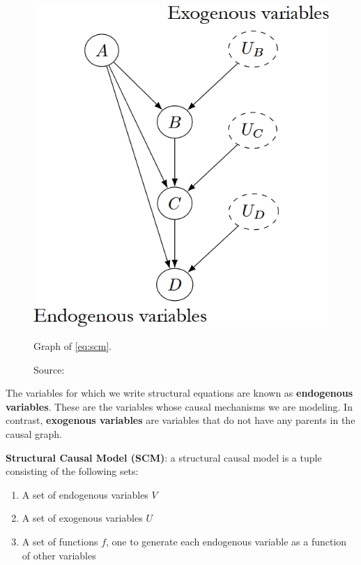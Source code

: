 \begin{figure}[H]
    \centering
    \includegraphics[width=.45\textwidth]{figures/ch3/24.scm.png}
    \caption{Graph of \ref{eq:scm}.}
    \vspace{-10px}
    \caption*{\scriptsize{Source: \cite{Neal_2020a}}}
    \label{fig:scm}
\end{figure}

The variables for which we write structural equations are known as
\textbf{endogenous variables}. These are the variables whose causal
mechanisms we are modeling.
In contrast, \textbf{exogenous variables} are variables that
do not have any parents in the causal graph.

\textbf{Structural Causal Model (SCM)}: a structural causal model
is a tuple consisting of the following sets:
\begin{enumerate}
    \item A set of endogenous variables \( V \)
    \item A set of exogenous variables \( U \)
    \item A set of functions \( f \), one to generate each
    endogenous variable as a function of other variables
\end{enumerate}